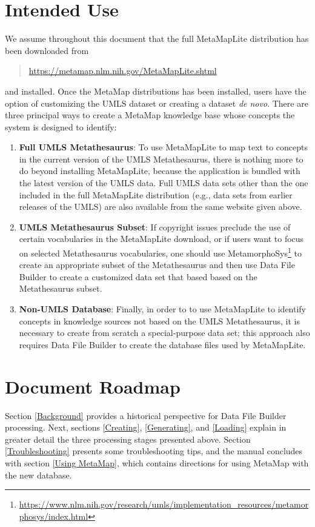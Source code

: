 \documentclass[letterpaper,article]{memoir}
\def\bf{\bfseries}
\begin{document}
\chapter{Intended Use}
\label{sec:intended_use}
We assume throughout this document that the full MetaMapLite distribution
has been downloaded from
\begin{quote}
\url{https://metamap.nlm.nih.gov/MetaMapLite.shtml}
\end{quote}
and installed.
Once the MetaMap distributions has been installed,
users have the option of customizing the UMLS dataset
or creating a dataset {\em de novo\/}.
There are three principal ways to create a MetaMap knowledge base
whose concepts the system is designed to identify:
\begin{enumerate}
    \item {\bf Full UMLS Metathesaurus}: To use MetaMapLite to map
      text to concepts in the current version of the UMLS
      Metathesaurus, there is nothing more to do beyond installing
      MetaMapLite, because the application is bundled with the latest
      version of the UMLS data.  Full UMLS data sets other than the
      one included in the full MetaMapLite distribution (e.g., data
      sets from earlier releases of the UMLS) are also available from
      the same website given above.
    \item {\bf UMLS Metathesaurus Subset}: If copyright issues
      preclude the use of certain vocabularies in the MetaMapLite
      download, or if users want to focus on selected Metathesaurus
      vocabularies, one should use
      MetamorphoSys\footnote{\url{https://www.nlm.nih.gov/research/umls/implementation_resources/metamorphosys/index.html}}
      to create an appropriate subset of the Metathesaurus and then
      use Data File Builder to create a customized data set that based
      based on the Metathesaurus subset.
    \item {\bf Non-UMLS Database}: Finally, in order to to use
      MetaMapLite to identify concepts in knowledge sources not based
      on the UMLS Metathesaurus, it is necessary to create from
      scratch a special-purpose data set; this approach also requires
      Data File Builder to create the database files used by
      MetaMapLite.
\end{enumerate}

\chapter{Document Roadmap}
Section \ref{Background}
provides a historical perspective for Data File Builder processing.
Next, sections \ref{Creating}, \ref{Generating}, and \ref{Loading}
explain in greater detail the three processing stages presented above.
Section \ref{Troubleshooting} presents some troubleshooting tips,
and the manual concludes with section \ref{Using MetaMap},
which contains directions for using MetaMap with the new database.
\end{document}
